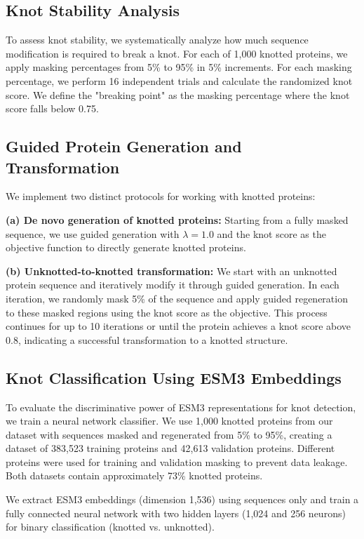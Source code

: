 \documentclass{article}
\theoremstyle{plain}
\theoremstyle{definition}
\theoremstyle{remark}
\begin{document}
\subsection{Knot Stability Analysis}

To assess knot stability, we systematically analyze how much sequence modification is required to break a knot. For each of 1,000 knotted proteins, we apply masking percentages from 5\% to 95\% in 5\% increments. For each masking percentage, we perform 16 independent trials and calculate the randomized knot score. We define the "breaking point" as the masking percentage where the knot score falls below 0.75.

\subsection{Guided Protein Generation and Transformation}

We implement two distinct protocols for working with knotted proteins:

\textbf{(a) De novo generation of knotted proteins:}
Starting from a fully masked sequence, we use guided generation with $\lambda=1.0$ and the knot score as the objective function to directly generate knotted proteins.

\textbf{(b) Unknotted-to-knotted transformation:}
We start with an unknotted protein sequence and iteratively modify it through guided generation. In each iteration, we randomly mask 5\% of the sequence and apply guided regeneration to these masked regions using the knot score as the objective. This process continues for up to 10 iterations or until the protein achieves a knot score above 0.8, indicating a successful transformation to a knotted structure.

\subsection{Knot Classification Using ESM3 Embeddings}

To evaluate the discriminative power of ESM3 representations for knot detection, we train a neural network classifier. We use 1,000 knotted proteins from our dataset with sequences masked and regenerated from 5\% to 95\%, creating a dataset of 383,523 training proteins and 42,613 validation proteins. Different proteins were used for training and validation masking to prevent data leakage. Both datasets contain approximately 73\% knotted proteins.

We extract ESM3 embeddings (dimension 1,536) using sequences only and train a fully connected neural network with two hidden layers (1,024 and 256 neurons) for binary classification (knotted vs. unknotted).
\end{document}

